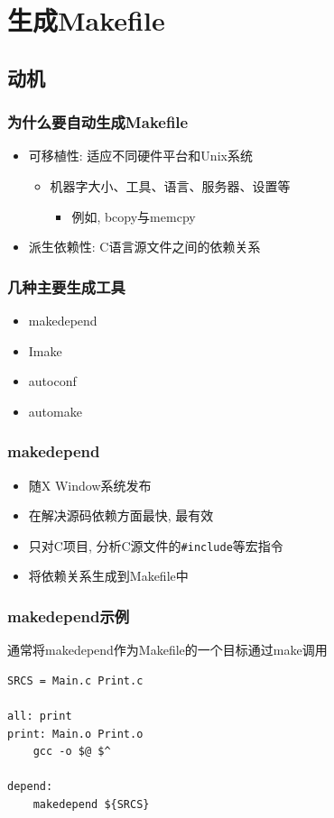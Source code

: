 \documentclass[compress]{beamer}
\begin{document}
\section{生成Makefile}

\subsection{动机}

\begin{frame}
\frametitle{为什么要自动生成Makefile}
\begin{itemize}
  \item 可移植性: 适应不同硬件平台和Unix系统
	\begin{itemize}
	  \item 机器字大小、工具、语言、服务器、设置等
		\begin{itemize}
		  \item 例如, bcopy与memcpy
		\end{itemize}
	\end{itemize}
  \item 派生依赖性: C语言源文件之间的依赖关系
\end{itemize}
\end{frame}

\begin{frame}
  \frametitle{几种主要生成工具}
  \begin{itemize}
	\item \alert{makedepend}
	\item Imake
	\item \alert{autoconf}
	\item automake
  \end{itemize}
  
\end{frame}

\begin{frame}[containsverbatim]
  \frametitle{makedepend}
  \begin{itemize}
	\item 随X Window系统发布
	\item 在解决源码依赖方面最快, 最有效
	\item 只对C项目, 分析C源文件的\verb~#include~等宏指令
	\item 将依赖关系生成到Makefile中
  \end{itemize}
  
\end{frame}

\begin{frame}[containsverbatim]
  \frametitle{makedepend示例}
  通常将makedepend作为Makefile的一个目标通过make调用\\
\begin{Verbatim}[showtabs=true]
SRCS = Main.c Print.c

all: print
print: Main.o Print.o
	gcc -o $@ $^

depend:
	makedepend ${SRCS}
\end{Verbatim}
\end{frame}
\end{document}

